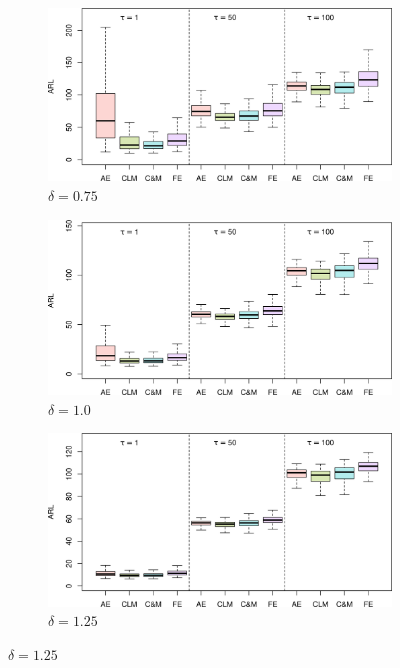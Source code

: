 \begin{figure}
\begin{subfigure}{0.49\textwidth}
\end{subfigure}
\begin{subfigure}{0.49\textwidth}
  \centering
  \caption{$ \delta = 0.75$}
  \label{fig:lambda=0.175/theta=4.0/delta=0.75}
  \includegraphics[width=\textwidth]{img/sims/theta=4.0_signedEWMA(l = 0.175, upw = true, L = 1.0)/delta=0.75.png}
\end{subfigure}
\begin{subfigure}{0.49\textwidth}
  \centering
  \caption{$ \delta = 1.0$}
  \label{fig:lambda=0.175/theta=4.0/delta=1.0}
  \includegraphics[width=\textwidth]{img/sims/theta=4.0_signedEWMA(l = 0.175, upw = true, L = 1.0)/delta=1.00.png}
\end{subfigure}
\begin{subfigure}{0.49\textwidth}
  \centering
  \caption{$ \delta = 1.25$}
  \label{fig:lambda=0.175/theta=4.0/delta=1.25}
  \includegraphics[width=\textwidth]{img/sims/theta=4.0_signedEWMA(l = 0.175, upw = true, L = 1.0)/delta=1.25.png}

\end{subfigure}
\end{figure}
